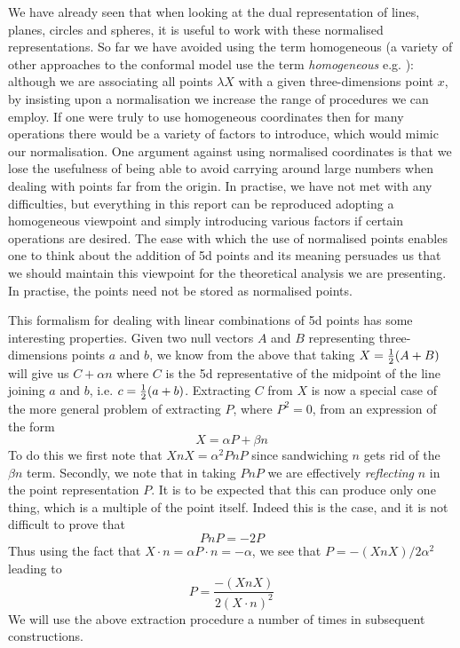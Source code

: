 We have already seen that when looking at the dual representation
of lines, planes, circles and spheres, it is useful to work with
these normalised representations. So far we have avoided using the
term homogeneous (a variety of other approaches to the conformal
model use the term \emph{homogeneous} e.g. \cite{oldwine}):
although we are associating all points $\lambda X$ with a given three-dimensions
point $x$, by insisting upon a normalisation we increase the range
of procedures we can employ. If one were truly to use homogeneous
coordinates then for many operations there would be a variety of
factors to introduce, which would mimic our normalisation. One
argument against using normalised coordinates is that we lose the
usefulness of being able to avoid carrying around large numbers
when dealing with points far from the origin. In practise, we have
not met with any difficulties, but everything in this report can be
reproduced adopting a homogeneous viewpoint and simply introducing
various factors if certain operations are desired. The ease with
which the use of normalised points enables one to think about the
addition of 5d points and its meaning persuades us that we should
maintain this viewpoint for the theoretical analysis we are
presenting. In practise, the points need not be stored as
normalised points.

 This formalism for dealing with linear combinations
of 5d points has some interesting properties. Given two
null vectors $A$ and $B$ representing three-dimensions points $a$ and
$b$, we know from the above that taking $X =\frac{1}{2} (A +
B)$ will give us  $C + \alpha n$ where $C$ is the 5d
representative of the midpoint of the line joining $a$
and $b$, i.e. $c=\frac{1}{2} (a+b)$. Extracting $C$ from $X$ is
now a special case of the more general problem of
extracting $P$, where $P^2=0$, from an expression of the
form
%
\[ X = \alpha P + \beta n   \]
%
To do this we first note that $XnX={\alpha}^2PnP$ since
sandwiching $n$ gets rid of the $\beta n$ term. Secondly,
we note that in taking $PnP$ we are effectively \emph{reflecting} 
$n$ in the point representation $P$. It is to be expected
that this can produce only one thing, which is a multiple
of the point itself. Indeed this is the case, and it is
not difficult to prove that
%
\[  PnP = -2P  \]
%
Thus using the fact that $X\cdot n = \alpha P\cdot n =
-\alpha$, we see that $P = -(XnX)/2\alpha^2$ leading to
%
\begin{equation}
  P =  \frac{-(XnX)}{2(X\cdot n)^2}
\end{equation}
%
We will use the above extraction procedure a number of
times in subsequent constructions.

